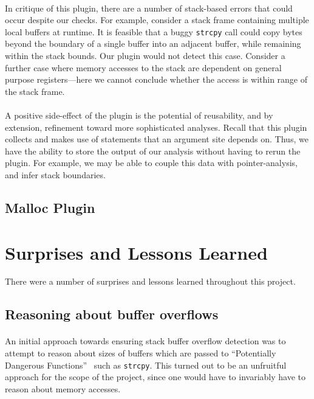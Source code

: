 \documentclass[letterpaper,11pt]{article}
\begin{document}
\paragraph{}
In critique of this plugin, there are a number of stack-based errors that could
occur despite our checks. For example, consider a stack frame containing
multiple local buffers at runtime. It is feasible that a buggy \texttt{strcpy}
call could copy bytes beyond the boundary of a single buffer into an adjacent
buffer, while remaining within the stack bounds. Our plugin would not detect
this case. Consider a further case where memory accesses to the stack
are dependent on general purpose registers---here we cannot conclude
whether the access is within range of the stack frame.

\paragraph{}
A positive side-effect of the plugin is the potential of reusability, and by
extension, refinement toward more sophisticated analyses. Recall that this
plugin collects and makes use of statements that an argument site depends on.
Thus, we have the ability to store the output of our analysis without having to
rerun the plugin. For example, we may be able to couple this data with
pointer-analysis, and infer stack boundaries.

\subsection{Malloc Plugin}

\section{Surprises and Lessons Learned}
\label{lessonslearned}

There were a number of surprises and lessons learned throughout this project.

\subsection{Reasoning about buffer overflows}
\paragraph{}

An initial approach towards ensuring stack buffer overflow detection was to
attempt to reason about sizes of buffers which are passed to ``Potentially
Dangerous Functions''~\cite{seacord2008cert} such as \texttt{strcpy}. This
turned out to be an unfruitful approach for the scope of the project, since one
would have to invariably have to reason about memory accesses.
\end{document}
